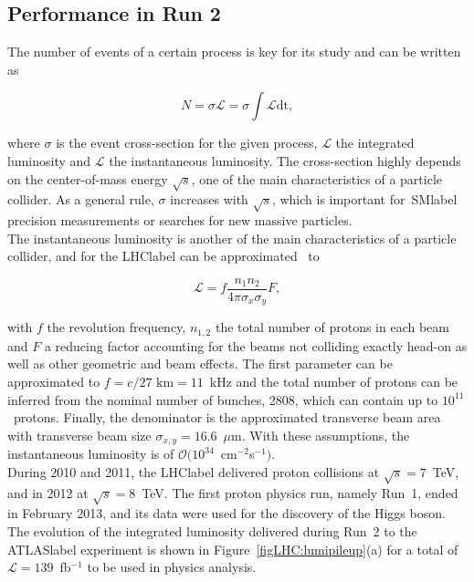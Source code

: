 \subsection{Performance in Run 2}

The number of events of a certain process is key for its study and can be written as

\begin{equation}
    N = \sigma\mathscr{L} = \sigma \int \mathcal{L} \text{dt},
\end{equation}

where $\sigma$ is the event cross-section for the given process, $\mathscr{L}$ the integrated luminosity and $\mathcal{L}$ the instantaneous luminosity. The cross-section highly depends on the center-of-mass energy $\sqrt{s}$, one of the main characteristics of a particle collider. As a general rule, $\sigma$ increases with $\sqrt{s}$, which is important for~\acrshort{SMlabel} precision measurements or searches for new massive particles.\\

The instantaneous luminosity is another of the main characteristics of a particle collider, and for the \acrshort{LHClabel} can be approximated~\cite{luminosity} to

\begin{equation}
    \mathcal{L} = f \frac{n_1n_2}{4\pi\sigma_x\sigma_y} F,
\end{equation}

with $f$ the revolution frequency, $n_{1,2}$ the total number of protons in each beam and $F$ a reducing factor accounting for the beams not colliding exactly head-on as well as other geometric and beam effects. The first parameter can be approximated to $f=c/27\text{ km} = 11$~kHz and the total number of protons can be inferred from the nominal number of bunches, 2808, which can contain up to $10^{11}$~protons. Finally, the denominator is the approximated transverse beam area with transverse beam size $\sigma_{x,y} = 16.6$~$\mu$m. With these assumptions, the instantaneous luminosity is of $\mathcal{O}(10^{34}$~cm$^{-2}$s$^{-1})$.\\

During 2010 and 2011, the \acrshort{LHClabel} delivered proton collisions at $\sqrt{s}=7$~TeV, and in 2012 at $\sqrt{s}=8$~TeV. The first proton physics run, namely Run~1, ended in February 2013, and its data were used for the discovery of the Higgs boson. The evolution of the integrated luminosity delivered during Run~2 to the \acrshort{ATLASlabel} experiment is shown in Figure~\ref{figLHC:lumipileup}(a) for a total of $\mathscr{L}=139$~fb$^{-1}$ to be used in physics analysis.\\

